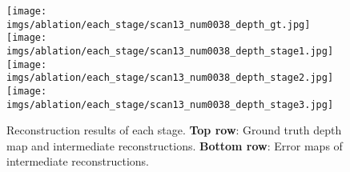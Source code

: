 \documentclass[10pt,twocolumn,letterpaper]{article}
\begin{document}
\begin{table}[t!]
\begin{center}
\footnotesize
{}
\end{center} 
\vspace{-5mm}
\caption{The statistical results of different stages in cascade cost volume.
The statistics are collected on the DTU evaluation set~\cite{aanaes2016dtu} using MVSNet+Ours.
The run-time is the sum of the current and previous stages. The base of resolution of input images in this experiment is 1152  864.
}
\label{tab:exp_runtime}
\end{table}

\begin{figure}[]
\begin{center}
 {\texttt{[image: imgs/ablation/each\_stage/scan13\_num0038\_depth\_gt.jpg]}}
 {\texttt{[image: imgs/ablation/each\_stage/scan13\_num0038\_depth\_stage1.jpg]}}
{\texttt{[image: imgs/ablation/each\_stage/scan13\_num0038\_depth\_stage2.jpg]}}
{\texttt{[image: imgs/ablation/each\_stage/scan13\_num0038\_depth\_stage3.jpg]}}
\end{center}
\vspace{-8mm}
 \caption{Reconstruction results of each stage. \textbf{Top row}: Ground truth depth map and intermediate reconstructions. \textbf{Bottom row}: Error maps of intermediate reconstructions.}
 \vspace{-6mm}
\label{fig:exp_each_stage}
\end{figure}
\end{document}
